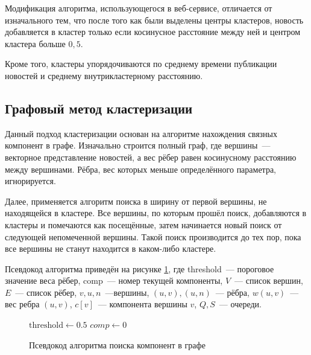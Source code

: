 \documentclass[a4paper, 14pt]{extarticle}
\begin{document}
Модификация алгоритма, использующегося в веб-сервисе, отличается от изначального тем, что после того как были выделены центры кластеров,
новость добавляется в кластер только если косинусное расстояние между ней и центром кластера больше $0,5$.

Кроме того, кластеры упорядочиваются по среднему времени публикации новостей и среднему внутрикластерному расстоянию.

\subsection{Графовый метод кластеризации}
Данный подход кластеризации основан на алгоритме нахождения связных компонент в графе. Изначально строится полный граф,
где вершины~--- векторное представление новостей, а вес рёбер равен косинусному расстоянию между вершинами.
Рёбра, вес которых меньше определённого параметра, игнорируется.

Далее, применяется алгоритм поиска в ширину от первой вершины, не находящейся в кластере. Все вершины, по которым прошёл поиск, добавляются
в кластеры и помечаются как посещённые, затем начинается новый поиск от следующей непомеченной вершины.
Такой поиск производится до тех пор, пока все вершины не станут находится в каком-либо кластере.

Псевдокод алгоритма приведён на рисунке \ref{pseudo}, где threshold~--- пороговое значение
веса рёбер, comp~--- номер текущей компоненты, $V$~--- список вершин, $E$~--- список рёбер,
$v,u,n$~---вершины, $(u,v),(u,n)$~--- рёбра,
$w(u,v)$~--- вес ребра $(u,v)$, $c[v]$~--- компонента вершины $v$, $Q,S$~--- очереди.

\begin{figure}[h]
\begin{algorithm}[H]
\DontPrintSemicolon
$\text{threshold} \gets 0.5$\;
$ comp \gets 0 $\;
\end{algorithm}
\caption{Псевдокод алгоритма поиска компонент в графе}
\label{pseudo}
\end{figure}
\end{document}
